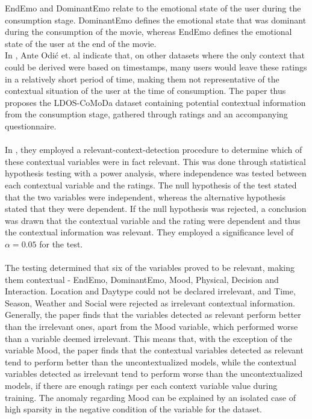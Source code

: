 EndEmo and DominantEmo relate to the emotional state of the user during the consumption stage.
DominantEmo defines the emotional state that was dominant during the consumption of the movie, whereas EndEmo defines the emotional state of the user at the end of the movie\cite{COMODA2013}.\\
In \cite{COMODA2013}, Ante Odić et. al indicate that, on other datasets where the only context that could be derived were based on timestamps, many users would leave these ratings in a relatively short period of time, making them not representative of the contextual situation of the user at the time of consumption.
The paper thus proposes the LDOS-CoMoDa dataset containing potential contextual information from the consumption stage, gathered through ratings and an accompanying questionnaire.
\\\\
In \cite{COMODA2013}, they employed a relevant-context-detection procedure to determine which of these contextual variables were in fact relevant.
This was done through statistical hypothesis testing with a power analysis, where independence was tested between each contextual variable and the ratings.
The null hypothesis of the test stated that the two variables were independent, whereas the alternative hypothesis stated that they were dependent.
If the null hypothesis was rejected, a conclusion was drawn that the contextual variable and the rating were dependent and thus the contextual information was relevant.
They employed a significance level of $\alpha = 0.05$ for the test.
\\\\
The testing determined that six of the variables proved to be relevant, making them contextual - EndEmo, DominantEmo, Mood, Physical, Decision and Interaction.
Location and Daytype could not be declared irrelevant, and Time, Season, Weather and Social were rejected as irrelevant contextual information.
Generally, the paper finds that the variables detected as relevant perform better than the irrelevant ones, apart from the Mood variable, which performed worse than a variable deemed irrelevant.
This means that, with the exception of the variable Mood, the paper finds that the contextual variables detected as relevant tend to perform better than the uncontextualized models, while the contextual variables detected as irrelevant tend to perform worse than the uncontextualized models, if there are enough ratings per each context variable value during training.
The anomaly regarding Mood can be explained by an isolated case of high sparsity in the negative condition of the variable for the dataset.

